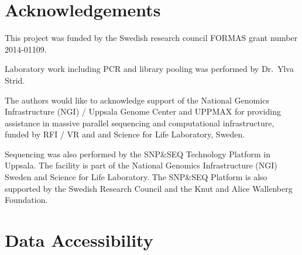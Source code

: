 \documentclass[
  12pt,
]{article}
\begin{document}
\hypertarget{acknowledgements}{%
\section*{Acknowledgements}\label{acknowledgements}}

This project was funded by the Swedish research council FORMAS grant number 2014-01109.

Laboratory work including PCR and library pooling was performed by Dr.~Ylva Strid.

The authors would like to acknowledge support of the National Genomics Infrastructure (NGI) / Uppsala Genome Center and UPPMAX for providing assistance in massive parallel sequencing and computational infrastructure, funded by RFI / VR and and Science for Life Laboratory, Sweden.

Sequencing was also performed by the SNP\&SEQ Technology Platform in Uppsala.
The facility is part of the National Genomics Infrastructure (NGI) Sweden and Science for Life Laboratory.
The SNP\&SEQ Platform is also supported by the Swedish Research Council and the Knut and Alice Wallenberg Foundation.

\singlespacing

\printbibliography

\doublespacing

\hypertarget{data-accessibility}{%
\section*{Data Accessibility}\label{data-accessibility}}
\end{document}

